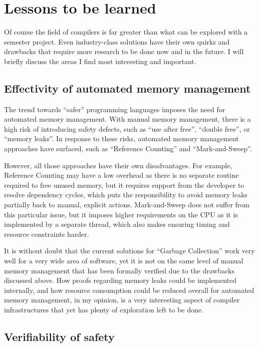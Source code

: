 \documentclass[]{tukportfolio}
\begin{document}
\section{Lessons to be learned}

Of course the field of compilers is far greater than what can be explored with a semester project. Even industry-class solutions have their own quirks and drawbacks that require more research to be done now and in the future. I will briefly discuss the areas I find most interesting and important.

\subsection{Effectivity of automated memory management}
\label{subsec:automem}

The trend towards ``safer'' programming languages imposes the need for automated memory management. With manual memory management, there is a high risk of introducing safety defects, such as ``use after free'', ``double free'', or ``memory leaks''. In response to these risks, automated memory management approaches have surfaced, such as ``Reference Counting'' and ``Mark-and-Sweep''.

However, all those approaches have their own disadvantages. For example, Reference Counting may have a low overhead as there is no separate routine required to free unused memory, but it requires support from the developer to resolve dependency cycles, which puts the responsibility to avoid memory leaks partially back to manual, explicit actions. Mark-and-Sweep does not suffer from this particular issue, but it imposes higher requirements on the CPU as it is implemented by a separate thread, which also makes ensuring timing and resource constraints harder.

It is without doubt that the current solutions for ``Garbage Collection'' work very well for a very wide area of software, yet it is not on the same level of manual memory management that has been formally verified due to the drawbacks discussed above. How proofs regarding memory leaks could be implemented internally, and how resource consumption could be reduced overall for automated memory management, in my opinion, is a very interesting aspect of compiler infrastructures that yet has plenty of exploration left to be done.

\subsection{Verifiability of safety}
\end{document}
